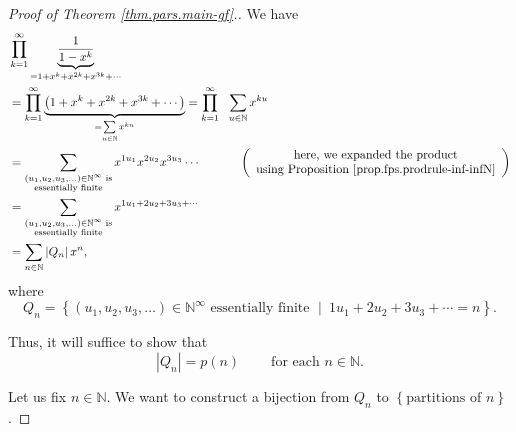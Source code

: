\begin{proof}
[Proof of Theorem \ref{thm.pars.main-gf}.]We have%
\begin{align*}
&  \prod_{k=1}^{\infty}\underbrace{\dfrac{1}{1-x^{k}}}_{=1+x^{k}+x^{2k}%
+x^{3k}+\cdots}\\
&  =\prod_{k=1}^{\infty}\underbrace{\left(  1+x^{k}+x^{2k}+x^{3k}%
+\cdots\right)  }_{=\sum\limits_{u\in\mathbb{N}}x^{ku}}=\prod_{k=1}^{\infty
}\ \ \sum_{u\in\mathbb{N}}x^{ku}\\
&  =\sum_{\substack{\left(  u_{1},u_{2},u_{3},\ldots\right)  \in
\mathbb{N}^{\infty}\text{ is}\\\text{essentially finite}}}x^{1u_{1}}x^{2u_{2}%
}x^{3u_{3}}\cdots\ \ \ \ \ \ \ \ \ \ \left(
\begin{array}
[c]{c}%
\text{here, we expanded the product}\\
\text{using Proposition \ref{prop.fps.prodrule-inf-infN}}%
\end{array}
\right) \\
&  =\sum_{\substack{\left(  u_{1},u_{2},u_{3},\ldots\right)  \in
\mathbb{N}^{\infty}\text{ is}\\\text{essentially finite}}}x^{1u_{1}%
+2u_{2}+3u_{3}+\cdots}\\
&  =\sum_{n\in\mathbb{N}}\left\vert Q_{n}\right\vert x^{n},
\end{align*}
where
\[
Q_{n}=\left\{  \left(  u_{1},u_{2},u_{3},\ldots\right)  \in\mathbb{N}^{\infty
}\text{ essentially finite }\mid\ 1u_{1}+2u_{2}+3u_{3}+\cdots=n\right\}  .
\]


Thus, it will suffice to show that%
\[
\left\vert Q_{n}\right\vert =p\left(  n\right)  \ \ \ \ \ \ \ \ \ \ \text{for
each }n\in\mathbb{N}.
\]


Let us fix $n\in\mathbb{N}$. We want to construct a bijection from $Q_{n}$ to
$\left\{  \text{partitions of }n\right\}  $.


\end{proof}
